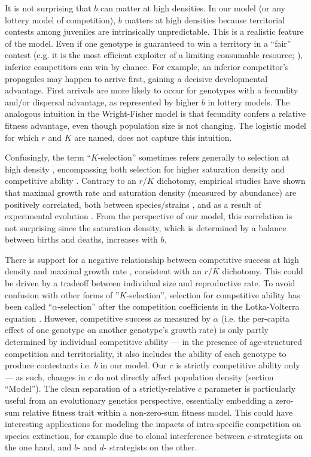 \documentclass[11pt]{article}
\begin{document}
It is not surprising that $b$ can matter at high densities. In our model (or any lottery model of competition), $b$ matters at high densities because territorial contests among juveniles are intrinsically unpredictable. This is a realistic feature of the model. Even if one genotype is guaranteed to win a territory in a ``fair'' contest (e.g. it is the most efficient exploiter of a limiting consumable resource; \citealt{tilman_1982}), inferior competitors can win by chance. For example, an inferior competitor's propagules may happen to arrive first, gaining a decisive developmental advantage. First arrivals are more likely to occur for genotypes with a fecundity and/or dispersal advantage, as represented by higher $b$ in lottery models. The analogous intuition in the Wright-Fisher model is that fecundity confers a relative fitness advantage, even though population size is not changing. The logistic model for which $r$ and $K$ are named, does not capture this intuition. 

Confusingly, the term ``$K$-selection'' sometimes refers generally to selection at high density \citep{pianka_1972}, encompassing both selection for higher saturation density \citep{macarthur_1967} and competitive ability \citep{gill_1974}. Contrary to an $r$/$K$ dichotomy, empirical studies have shown that maximal growth rate and saturation density (measured by abundance) are positively correlated, both between species/strains \citep{luckinbill_1979,kuno_1991,hendriks_2005,fitzsimmons_2010}, and as a result of experimental evolution \citep{luckinbill_1978,luckinbill_1979}. From the perspective of our model, this correlation is not surprising since the saturation density, which is determined by a balance between births and deaths, increases with $b$.

There is support for a negative relationship between competitive success at high density and maximal growth rate \citep{luckinbill_1979}, consistent with an $r$/$K$ dichotomy. This could be driven by a tradeoff between individual size and reproductive rate. To avoid confusion with other forms of ''$K$-selection'', selection for competitive ability has been called ``$\alpha$-selection'' after the competition coefficients in the Lotka-Volterra equation \citep{gill_1974,case_1974,joshi_2001}. However, competitive success as measured by $\alpha$ (i.e. the per-capita effect of one genotype on another genotype's growth rate) is only partly determined by individual competitive ability --- in the presence of age-structured competition and territoriality, it also includes the ability of each genotype to produce contestants i.e. $b$ in our model. Our $c$ is strictly competitive ability only --- as such, changes in $c$ do not directly affect population density (section ``Model''). The clean separation of a strictly-relative $c$ parameter is particularly useful from an evolutionary genetics perspective, essentially embedding a zero-sum relative fitness trait within a non-zero-sum fitness model. This could have interesting applications for modeling the impacts of intra-specific competition on species extinction, for example due to clonal interference \citep{gerrish_1998,desai_2007} between $c$-strategists on the one hand, and $b$- and $d$- strategists on the other.
\end{document}

